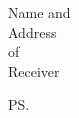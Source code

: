 \documentclass[letterpaper,12pt]{letter}
\begin{document}
\begin{letter}{Name and \\ Address \\ of \\ Receiver}

\opening{} %



\closing{} %

\cc{} %
\encl{} %
\ps{} %

\end{letter}
\end{document}
